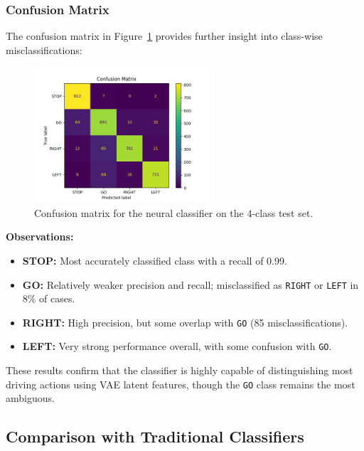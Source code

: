 \subsubsection*{Confusion Matrix}

The confusion matrix in Figure~\ref{fig:conf_matrix} provides further insight into class-wise misclassifications:

\begin{figure}[h]
    \centering
    \includegraphics[width=0.6\textwidth]{img/classifier/confusion_matrix_4_classes.png}
    \caption{Confusion matrix for the neural classifier on the 4-class test set.}
    \label{fig:conf_matrix}
\end{figure}

\textbf{Observations:}
\begin{itemize}
    \item \textbf{STOP:} Most accurately classified class with a recall of 0.99.
    \item \textbf{GO:} Relatively weaker precision and recall; misclassified as \texttt{RIGHT} or \texttt{LEFT} in 8\% of cases.
    \item \textbf{RIGHT:} High precision, but some overlap with \texttt{GO} (85 misclassifications).
    \item \textbf{LEFT:} Very strong performance overall, with some confusion with \texttt{GO}.
\end{itemize}

These results confirm that the classifier is highly capable of distinguishing most driving actions using VAE latent features, though the \texttt{GO} class remains the most ambiguous.




\subsection{Comparison with Traditional Classifiers}

